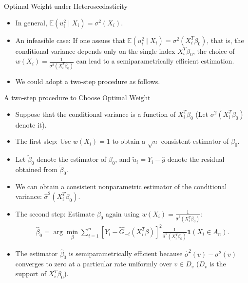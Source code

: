 \documentclass[xcolor=svgnames,dvipdfmx,cjk]{beamer}
\theoremstyle{example}
\def\E{\mathbb{E}}
\begin{document}
  \begin{frame}{Optimal Weight under Heteroscedasticity}
    \begin{itemize}
      \item In general, $\E(u_i^2 \mid X_i) = \sigma^2(X_i)$.
      \item \alert{An infeasible case}: 
            If one assues that  $\E(u_i^2 \mid X_i) = \sigma^2(X_i^{T}\beta_0)$,
            that is, the conditional variance depends only on the single index $X_i^{T}\beta_0$,
            the choice of $w(X_i) = \frac{1}{\sigma^2({X_i^{T}\beta_0})}$ can lead to a semiparametrically efficient estimation.
      \item We could adopt a two-step procedure as follows.
    \end{itemize}
  \end{frame}
  
  \begin{frame}{A two-step procedure to Choose Optimal Weight}
    \begin{itemize}
      \item Suppose that the conditional variance is a function of $X_i^{T}\beta_0$ (Let $\sigma^2({X_i^{T}\beta_0})$ denote it).
      \item \alert{The first step}: Use $w(X_i)=1$ to obtain a $\sqrt{n}$-consistent estimator of $\beta_0$.
        
      \item Let $\tilde{\beta}_0$ denote the estimator of $\beta_0$, 
            and $\tilde{u}_i = Y_i - \hat{g}$ denote the residual obtained from $\tilde{\beta}_0$.
      \item We can obtain a consistent nonparametric estimator of the conditional variance: $\hat{\sigma}^2({X_i^{T}\beta_0})$.
      \item \alert{The second step}: Estimate $\beta_0$ again using $w(X_i)= \frac{1}{\hat{\sigma}^2({X_i^{T}\beta_0})}$:
            \begin{align*}
              \hat{\beta}_0 = 
              \arg \min_{\beta} 
              \sum_{i=1}^{n}  
                    \left[ Y_i - \hat{G}_{-i}(X_i^{T}\beta) \right]^2 
                    \frac{1}{\hat{\sigma}^2({X_i^{T}\beta_0})} \mathbf{1}(X_i \in A_n).
            \end{align*}
      \item The estimator $\hat{\beta}_0$ is semiparametrically efficient because
            $\hat{\sigma}^2(v) - \sigma^2(v)$ converges to zero at a particular rate 
            uniformly over $v \in D_v$ ($D_v$ is the support of $X_i^{T}\beta_0$).
    \end{itemize}
  \end{frame}
  
\end{document}
